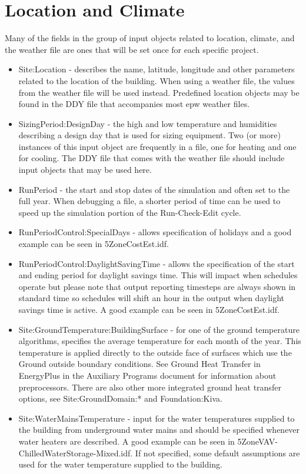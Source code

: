 \section{Location and Climate}

Many of the fields in the group of input objects related to location,
climate, and the weather file are ones that will be set once for each
specific project.
\begin{itemize}
\item Site:Location - describes the name, latitude, longitude and other
parameters related to the location of the building. When using a weather
file, the values from the weather file will be used instead. Predefined
location objects may be found in the DDY file that accompanies most
epw weather files.
\item SizingPeriod:DesignDay - the high and low temperature and humidities
describing a design day that is used for sizing equipment. Two (or
more) instances of this input object are frequently in a file, one
for heating and one for cooling. The DDY file that comes with the
weather file should include input objects that may be used here.
\item RunPeriod - the start and stop dates of the simulation and often set
to the full year. When debugging a file, a shorter period of time
can be used to speed up the simulation portion of the Run-Check-Edit
cycle.
\item RunPeriodControl:SpecialDays - allows specification of holidays and
a good example can be seen in 5ZoneCostEst.idf.
\item RunPeriodControl:DaylightSavingTime - allows the specification of
the start and ending period for daylight savings time. This will impact
when schedules operate but please note that output reporting timesteps
are always shown in standard time so schedules will shift an hour
in the output when daylight savings time is active. A good example
can be seen in 5ZoneCostEst.idf.
\item Site:GroundTemperature:BuildingSurface - for one of the ground temperature
algorithms, specifies the average temperature for each month of the
year. This temperature is applied directly to the outside face of
surfaces which use the \textquotedbl Ground\textquotedbl{} outside
boundary conditions. See \textquotedbl Ground Heat Transfer in EnergyPlus\textquotedbl{}
in the Auxiliary Programs document for information about preprocessors.
There are also other more integrated ground heat transfer options,
see Site:GroundDomain:{*} and Foundation:Kiva.
\item Site:WaterMainsTemperature - input for the water temperatures supplied
to the building from underground water mains and should be specified
whenever water heaters are described. A good example can be seen in
5ZoneVAV-ChilledWaterStorage-Mixed.idf. If not specified, some default
assumptions are used for the water temperature supplied to the building.
\end{itemize}



